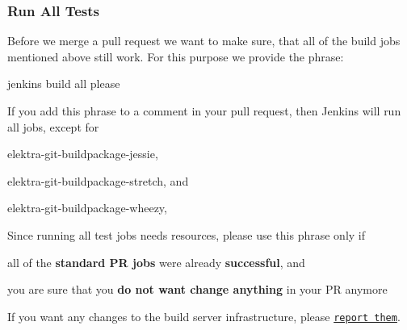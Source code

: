 \subsubsection*{Run All Tests}

Before we merge a pull request we want to make sure, that all of the build jobs mentioned above still work. For this purpose we provide the phrase\+:


\begin{DoxyCode}
jenkins build all please
\end{DoxyCode}


If you add this phrase to a comment in your pull request, then Jenkins will run all jobs, except for


\begin{DoxyItemize}
\item {\ttfamily elektra-\/git-\/buildpackage-\/jessie},
\item {\ttfamily elektra-\/git-\/buildpackage-\/stretch}, and
\item {\ttfamily elektra-\/git-\/buildpackage-\/wheezy},
\end{DoxyItemize}

Since running all test jobs needs resources, please use this phrase only if


\begin{DoxyItemize}
\item all of the {\bfseries standard PR jobs} were already {\bfseries successful}, and
\item you are sure that you {\bfseries do not want change anything} in your PR anymore
\end{DoxyItemize}

If you want any changes to the build server infrastructure, please \href{https://issues.libelektra.org/160}{\tt report them}. 